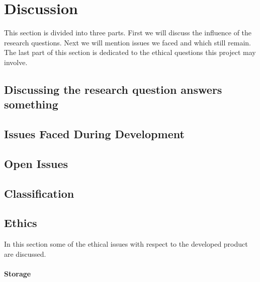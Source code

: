 \chapter{Discussion}

This section is divided into three parts. First we will discuss the influence of the research questions. Next we will mention issues we faced and which still remain. The last part of this section is dedicated to the ethical questions this project may involve.

\section{Discussing the research question answers something} 

\section{Issues Faced During Development}
    


\section{Open Issues}

\section{Classification}

\section{Ethics}
In this section some of the ethical issues with respect to the developed product are discussed. 

\subsubsection{Storage}

